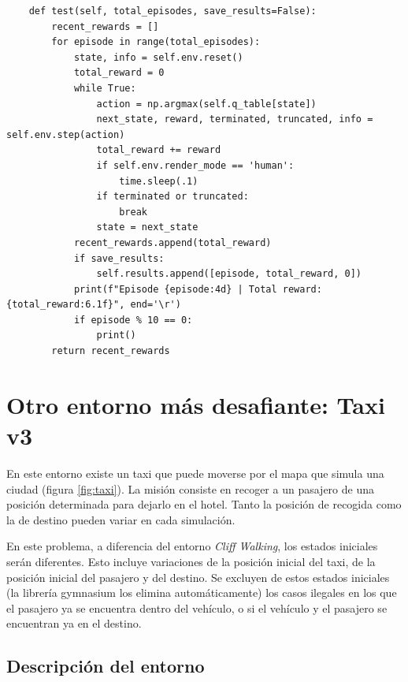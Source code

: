 \documentclass{article}
\begin{document}
\begin{verbatim}
    def test(self, total_episodes, save_results=False):
        recent_rewards = []
        for episode in range(total_episodes):
            state, info = self.env.reset()
            total_reward = 0
            while True:
                action = np.argmax(self.q_table[state])  
                next_state, reward, terminated, truncated, info = self.env.step(action)
                total_reward += reward
                if self.env.render_mode == 'human':
                    time.sleep(.1)
                if terminated or truncated:
                    break
                state = next_state
            recent_rewards.append(total_reward)
            if save_results:
                self.results.append([episode, total_reward, 0])
            print(f"Episode {episode:4d} | Total reward: {total_reward:6.1f}", end='\r')
            if episode % 10 == 0:
                print()
        return recent_rewards
\end{verbatim}






\section{Otro entorno más desafiante: Taxi v3}
En este entorno existe un taxi que puede moverse por el mapa que simula una ciudad (figura \ref{fig:taxi}). La misión consiste en recoger a un pasajero de una posición determinada para dejarlo en el hotel. Tanto la posición de recogida como la de destino pueden variar en cada simulación.

En este problema, a diferencia del entorno \textit{Cliff Walking}, los estados iniciales serán diferentes. Esto incluye variaciones de la posición inicial del taxi, de la posición inicial del pasajero y del destino. Se excluyen de estos estados iniciales (la librería gymnasium los elimina automáticamente) los casos ilegales en los que el pasajero ya se encuentra dentro del vehículo, o si el vehículo y el pasajero se encuentran ya en el destino.
\subsection{Descripción del entorno}
\end{document}
